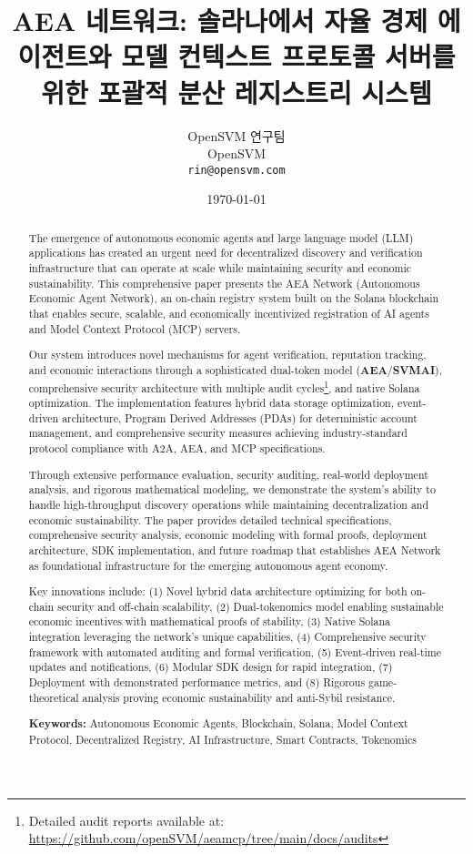 \documentclass[12pt,a4paper]{article}
\title{AEA 네트워크: 솔라나에서 자율 경제 에이전트와 모델 컨텍스트 프로토콜 서버를 위한 포괄적 분산 레지스트리 시스템}
\author{OpenSVM 연구팀\\
OpenSVM\\
\texttt{rin@opensvm.com}}
\date{\today}
\begin{document}
\maketitle

\begin{abstract}
The emergence of autonomous economic agents and large language model (LLM) applications has created an urgent need for decentralized discovery and verification infrastructure that can operate at scale while maintaining security and economic sustainability. This comprehensive paper presents the AEA Network (Autonomous Economic Agent Network), an on-chain registry system built on the Solana blockchain that enables secure, scalable, and economically incentivized registration of AI agents and Model Context Protocol (MCP) servers.

Our system introduces novel mechanisms for agent verification, reputation tracking, and economic interactions through a sophisticated dual-token model (\textbf{AEA}/\textbf{SVMAI}), comprehensive security architecture with multiple audit cycles\footnote{Detailed audit reports available at: \url{https://github.com/openSVM/aeamcp/tree/main/docs/audits}}, and native Solana optimization. The implementation features hybrid data storage optimization, event-driven architecture, Program Derived Addresses (PDAs) for deterministic account management, and comprehensive security measures achieving industry-standard protocol compliance with A2A, AEA, and MCP specifications.

Through extensive performance evaluation, security auditing, real-world deployment analysis, and rigorous mathematical modeling, we demonstrate the system's ability to handle high-throughput discovery operations while maintaining decentralization and economic sustainability. The paper provides detailed technical specifications, comprehensive security analysis, economic modeling with formal proofs, deployment architecture, SDK implementation, and future roadmap that establishes AEA Network as foundational infrastructure for the emerging autonomous agent economy.

Key innovations include: (1) Novel hybrid data architecture optimizing for both on-chain security and off-chain scalability, (2) Dual-tokenomics model enabling sustainable economic incentives with mathematical proofs of stability, (3) Native Solana integration leveraging the network's unique capabilities, (4) Comprehensive security framework with automated auditing and formal verification, (5) Event-driven real-time updates and notifications, (6) Modular SDK design for rapid integration, (7) Deployment with demonstrated performance metrics, and (8) Rigorous game-theoretical analysis proving economic sustainability and anti-Sybil resistance.

\textbf{Keywords:} Autonomous Economic Agents, Blockchain, Solana, Model Context Protocol, Decentralized Registry, AI Infrastructure, Smart Contracts, Tokenomics
\end{abstract}
\end{document}
